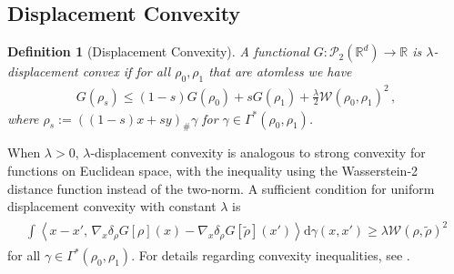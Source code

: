 \documentclass[11pt,a4paper,final]{article}
\def\P{\mathcal P}
\def\R{\mathbb R}
\newcommand{\Wass}{\mathscr{W}}
\renewcommand{\d}{\mathrm{d}}
\newcommand{\ddss}{\frac{\d^2}{\d s^2}}
\newcommand{\1}{\mathbf{1}}
\def\<#1,#2>{\left\langle #1,\,#2\right\rangle}
\theoremstyle{plain}
\newtheorem{definition}[theorem]{Definition}
\numberwithin{equation}{section}
\numberwithin{theorem}{section}
\begin{document}
\subsection{Displacement Convexity}
\begin{definition}[Displacement Convexity]\label{def:displacement_convexity}
A functional $G:\P_2(\R^d)\to\R$ is \emph{$\lambda$-displacement convex} if for all $\rho_0,\rho_1$ that are atomless we have
\begin{align*}
    G(\rho_s) \leq (1-s)G(\rho_0) + s G(\rho_1) + \frac{\lambda}{2} \Wass(\rho_0,\rho_1)^2\,,
\end{align*}
where $\rho_s:=((1-s)x+sy)_\# \gamma$ for $\gamma\in\Gamma^*(\rho_0,\rho_1)$.
\end{definition}

When $\lambda>0$, $\lambda$-displacement convexity is analogous to strong convexity for functions on Euclidean space, with the inequality using the Wasserstein-2 distance function instead of the two-norm. 
A sufficient condition for uniform displacement convexity with constant $\lambda$ is 
\begin{align}
\begin{split}
        \int \<x-x',\nabla_x \delta_\rho G[\rho](x) - \nabla_x \delta_\rho G[\tilde \rho](x') > \d \gamma(x,x')  
    \ge \lambda \Wass(\rho,\tilde\rho)^2
\end{split}
\end{align}
for all $\gamma\in\Gamma^*(\rho_0,\rho_1)$.
For details regarding convexity inequalities, see \cite[Proposition 16.4]{Villani07}. 
\end{document}

